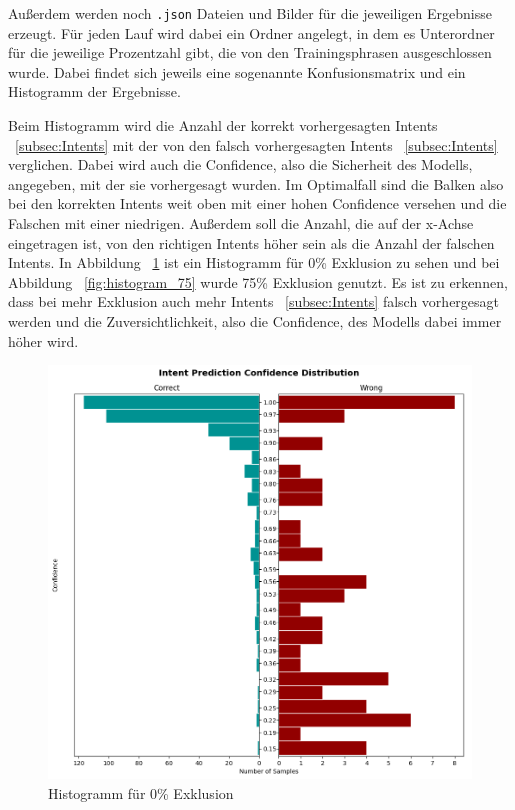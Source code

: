 Außerdem werden noch \texttt{.json} Dateien und Bilder für die jeweiligen Ergebnisse erzeugt.
Für jeden Lauf wird dabei ein Ordner angelegt, in dem es Unterordner für die jeweilige Prozentzahl gibt, die von den Trainingsphrasen ausgeschlossen wurde.
Dabei findet sich jeweils eine sogenannte Konfusionsmatrix und ein Histogramm der Ergebnisse.

Beim Histogramm wird die Anzahl der korrekt vorhergesagten Intents ~\ref{subsec:Intents} mit der von den falsch vorhergesagten Intents ~\ref{subsec:Intents} verglichen.
Dabei wird auch die Confidence, also die Sicherheit des Modells, angegeben, mit der sie vorhergesagt wurden.
Im Optimalfall sind die Balken also bei den korrekten Intents weit oben mit einer hohen Confidence versehen und die Falschen mit einer niedrigen.
Außerdem soll die Anzahl, die auf der x-Achse eingetragen ist, von den richtigen Intents höher sein als die Anzahl der falschen Intents.
In Abbildung ~\ref{fig:histogram_0} ist ein Histogramm für 0\% Exklusion zu sehen und bei Abbildung ~\ref{fig:histogram_75} wurde 75\% Exklusion genutzt.
Es ist zu erkennen, dass bei mehr Exklusion auch mehr Intents ~\ref{subsec:Intents} falsch vorhergesagt werden und die Zuversichtlichkeit, also die Confidence, des Modells dabei immer höher wird.

\begin{figure}[hbt!]
    \centering
    \includegraphics[scale=0.5]{pics/intent_histogram_0}
    \caption{Histogramm für 0\% Exklusion}
    \label{fig:histogram_0}
\end{figure}

